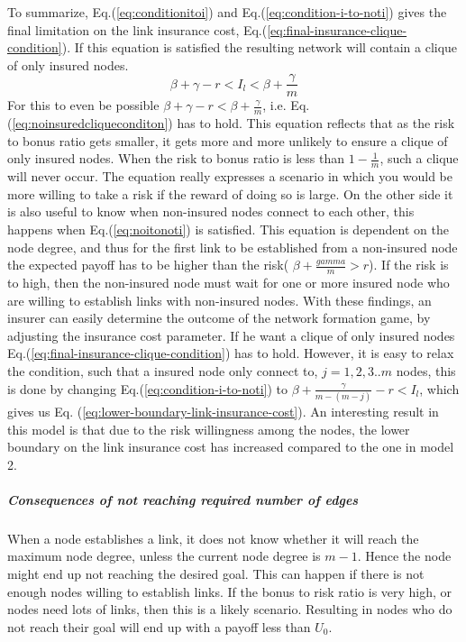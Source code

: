 To summarize, Eq.(\ref{eq:conditionitoi}) and Eq.(\ref{eq:condition-i-to-noti}) gives the final limitation on the link insurance cost, Eq.(\ref{eq:final-insurance-clique-condition}). If this equation is satisfied the resulting network will contain a clique of only insured nodes.
\begin{equation}
\beta+\gamma-r<I_{l}<\beta+\frac{\gamma}{m}
\label{eq:final-insurance-clique-condition}
\end{equation}
For this to even be possible $\beta+\gamma-r<\beta+\frac{\gamma}{m}$, i.e. Eq.(\ref{eq:noinsuredcliqueconditon}) has to hold. This equation reflects that as the risk to bonus ratio gets smaller, it gets more and more unlikely to ensure a clique of only insured nodes. When the risk to bonus ratio is less than $1-\frac{1}{m}$, such a clique will never occur. The equation really expresses a scenario in which you would be more willing to take a risk if the reward of doing so is large.
On the other side it is also useful to know when non-insured nodes connect to each other, this happens when Eq.(\ref{eq:noitonoti}) is satisfied. This equation is dependent on the node degree, and thus for the first link to be established from a non-insured node the expected payoff has to be higher than the risk( $\beta+\frac{gamma}{m}>r$). If the risk is to high, then the non-insured node must wait for one or more insured node who are willing to establish links with non-insured nodes.
With these findings, an insurer can easily determine the outcome of the network formation game, by adjusting the
insurance cost parameter. If he want a clique of only insured nodes Eq.(\ref{eq:final-insurance-clique-condition}) has to
hold. However, it is easy to relax the condition, such that a insured node only connect to, $j=1,2,3..m$ nodes,
   this is done by changing Eq.(\ref{eq:condition-i-to-noti}) to $\beta+\frac{\gamma}{m-(m-j)}-r<I_{l}$, which
    gives us Eq. (\ref{eq:lower-boundary-link-insurance-cost}).
An interesting result in this model is that due to the risk willingness among the nodes, the lower boundary on the link insurance cost has increased compared to the one in model 2. 

\subparagraph{Consequences of not reaching required number of edges}
When a node establishes a link, it does not know whether it will reach the maximum node degree, unless the current node degree is $m-1$. Hence the node might end up not reaching the desired goal. This can happen if there is not enough nodes willing to establish links. If the bonus to risk ratio is very high, or nodes need lots of links, then this is a likely scenario. Resulting in nodes who do not reach their goal will end up with a payoff less than $U_{0}$. 

